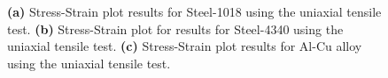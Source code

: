 \documentclass{article}
\begin{document}
\begin{figure}[H]
\centering
{}
\caption{\textbf{(a)} Stress-Strain plot results for Steel-1018 using the uniaxial tensile test. \textbf{(b)} Stress-Strain plot for results for Steel-4340 using the uniaxial tensile test. \textbf{(c)} Stress-Strain plot results for Al-Cu alloy using the uniaxial tensile test.}
\end{figure}
\end{document}
